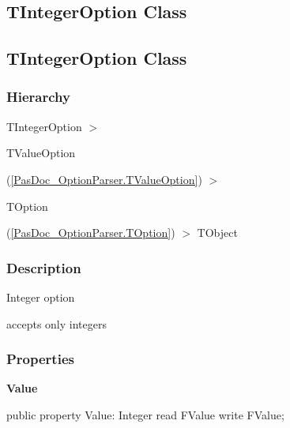 \documentclass{report}
\newif\ifpdf
\begin{document}
\subsection*{\large{\textbf{TIntegerOption Class}}\normalsize\hspace{1ex}\hrulefill}
\else
\subsection*{TIntegerOption Class}
\fi
\label{PasDoc_OptionParser.TIntegerOption}
\subsubsection*{\large{\textbf{Hierarchy}}\normalsize\hspace{1ex}\hfill}
TIntegerOption {$>$} \begin{ttfamily}TValueOption\end{ttfamily}(\ref{PasDoc_OptionParser.TValueOption}) {$>$} \begin{ttfamily}TOption\end{ttfamily}(\ref{PasDoc_OptionParser.TOption}) {$>$} 
TObject
\subsubsection*{\large{\textbf{Description}}\normalsize\hspace{1ex}\hfill}
Integer option\hfill\vspace*{1ex}

 accepts only integers\subsubsection*{\large{\textbf{Properties}}\normalsize\hspace{1ex}\hfill}
\begin{list}{}{
\setlength{\itemindent}{0cm}
\setlength{\listparindent}{0cm}
\setlength{\leftmargin}{\evensidemargin}
\addtolength{\leftmargin}{\tmplength}
\settowidth{\labelsep}{X}
\addtolength{\leftmargin}{\labelsep}
\setlength{\labelwidth}{\tmplength}
}
\label{PasDoc_OptionParser.TIntegerOption-Value}
\item[\textbf{Value}\hfill]
\ifpdf
\begin{flushleft}
\fi
\begin{ttfamily}
public property Value: Integer read FValue write FValue;\end{ttfamily}

\ifpdf
\end{flushleft}
\fi


\par  \end{list}
\end{document}

